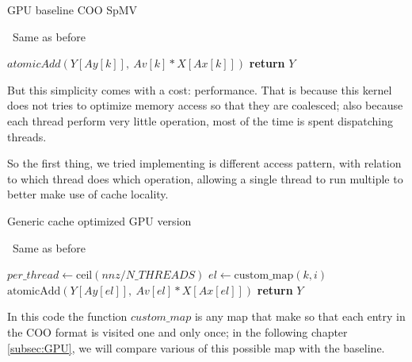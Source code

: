 \documentclass[conference]{IEEEtran}
\begin{document}
\begin{algorithm}[h!]
	\caption{GPU baseline COO SpMV}
	\algorithmicrequire~Same as before
	\begin{algorithmic}[1]
		\State $atomicAdd(Y[Ay[k]],\ Av[k] * X[Ax[k]]) $\label{partitioning}
		\EndFor
		\State \textbf{return} $Y$
		\EndProcedure
	\end{algorithmic}
	\label{alg:COO_GPU}
\end{algorithm}

But this simplicity comes with a cost: performance. That is because this kernel does not tries to optimize memory access so that they are coalesced; also because each thread perform very little operation, most of the time is spent dispatching threads.

So the first thing, we tried implementing is different access pattern, with relation to which thread does which operation, allowing a single thread to run multiple to better make use of cache locality.


\begin{algorithm}[h!]
	\caption{Generic cache optimized GPU version}
	\algorithmicrequire~Same as before
	\begin{algorithmic}[1]
		\State $per\_thread \leftarrow \text{ceil}(nnz / N\_THREADS)$
		\State $el \leftarrow \text{custom\_map}(k, i)$
		\State $\text{atomicAdd}(Y[Ay[el]],\ Av[el] * X[Ax[el]]) $\label{partitioning}
		\EndFor
		\EndFor
		\State \textbf{return} $Y$
		\EndProcedure
	\end{algorithmic}
	\label{alg:GPU_cache_opt}
\end{algorithm}
\FloatBarrier

In this code the function $custom\_map$ is any map that make so that each entry in the COO format is visited one and only once; in the following chapter \ref{subsec:GPU}, we will compare various of this possible map with the baseline.
\end{document}
